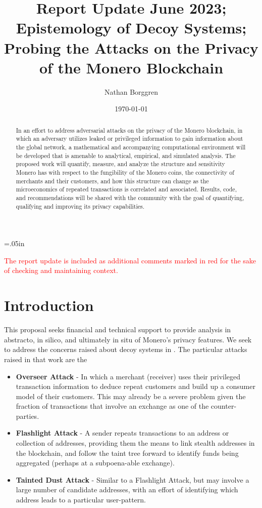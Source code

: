 \documentclass[prc, 12pt]{revtex4-1}
\begin{document}
 \topmargin=.05in
 \title{Report Update June 2023; Epistemology of Decoy Systems; Probing the Attacks on the Privacy of the Monero Blockchain}
 \author{Nathan Borggren}
 \date{\today}

\begin{abstract}
In an effort to address adversarial attacks on the privacy of the Monero blockchain, in which an adversary utilizes leaked or privileged information to gain information about the global network, a mathematical and accompanying computational environment will be developed that is amenable to analytical, empirical, and simulated analysis.  The proposed work will quantify, measure, and analyze the structure and sensitivity Monero has with respect to the fungibility of the Monero coins, the connectivity of merchants and their customers, and how this structure can change as the microeconomics of repeated transactions is correlated and associated.  Results, code, and recommendations will be shared with the community with the goal of quantifying, qualifying and improving its privacy capabilities.
\end{abstract}

\maketitle{}

\textcolor{red}{The report update is included as additional comments marked in red for the sake of checking and maintaining context.}

\section{Introduction}

This proposal seeks financial and technical support to provide analysis in abstracto, in silico, and ultimately in situ of Monero's privacy features.  We seek to address the concerns raised about decoy systems in \cite{MiersZcash}.  The particular attacks raised in that work are the 

\begin{itemize}
   \item \textbf{Overseer Attack} - In which a merchant (receiver) uses their privileged transaction information to deduce repeat customers and build up a consumer model of their customers.  This may already be a severe problem given the fraction of transactions that involve an exchange as one of the counter-parties.  
   \item \textbf{Flashlight Attack} - A sender repeats transactions to an address or collection of addresses, providing them the means to link stealth addresses in the blockchain, and follow the taint tree forward to identify funds being aggregated (perhaps at a subpoena-able exchange).
   \item \textbf{Tainted Dust Attack} - Similar to a Flashlight Attack, but may involve a large number of candidate addresses, with an effort of identifying which address leads to a particular user-pattern.
\end{itemize}
\end{document}
